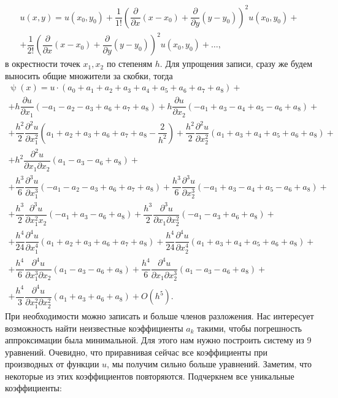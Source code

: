 \documentclass[a4paper, 12pt]{article}
\renewcommand{\psi}{\uppsi}
\renewcommand{\d}{\partial}
\begin{document}
\begin{enumerate}
\begin{multline*}
		u(x,y) = u(x_0, y_0) + \dfrac{1}{1!}\left(\dfrac{\d }{\d x}(x-x_0) +\dfrac{\d }{\d y}(y-y_0)\right)^2u(x_0, y_0) +\\+  \dfrac{1}{2!}\left(\dfrac{\d }{\d x}(x-x_0) +\dfrac{\d }{\d y}(y-y_0)\right)^2u(x_0, y_0) + \ldots,
	\end{multline*} в окрестности точек $x_1, x_2$ по степеням $h$. Для упрощения записи, сразу же будем выносить общие множители за скобки, тогда
	\begin{multline*}
		\psi(x) = u\cdot (a_0 + a_1 + a_2 + a_3 + a_4 + a_5 + a_6 + a_7 + a_8) + \\ + h\dfrac{\d u}{\d x_1} (-a_1 -a_2 -a_3 + a_6 + a_7 + a_8) + h\dfrac{\d u}{\d x_2} (-a_1 +a_3 - a_4 + a_5 - a_6 + a_8) + \\ + \dfrac{h^2}{2}\dfrac{\d^2 u}{\d x_1^2} \left(a_1 + a_2 + a_3 + a_6 + a_7 + a_8 - \dfrac{2}{h^2}\right) + \dfrac{h^2}{2}\dfrac{\d^2 u}{\d x_2^2} \left(a_1 + a_3 + a_4 + a_5 + a_6 + a_8\right) + \\ + h^2\dfrac{\d^2 u}{\d x_1 \d x_2} \left(a_1 - a_3 - a_6 + a_8\right) + \\ + \dfrac{h^3}{6} \dfrac{\d^3 u}{\d x_1^3} ( -a_1 -a_2 - a_3 + a_6 + a_7 + a_8) + \dfrac{h^3}{6} \dfrac{\d^3 u}{\d x_2^3} ( -a_1 + a_3 - a_4 + a_5 - a_6 + a_8) + \\ + \dfrac{h^3}{2} \dfrac{\d^3 u}{\d x_1^2 x_2} ( -a_1 +a_3 - a_6 + a_8) + \dfrac{h^3}{2} \dfrac{\d^3 u}{\d x_1 \d x_2^2} ( -a_1 -a_3 + a_6 + a_8) + \\ + \dfrac{h^4}{24} \dfrac{\d^4 u}{\d x_1^4} ( a_1 + a_2 + a_3 + a_6 + a_7 + a_8) +   \dfrac{h^4}{24} \dfrac{\d^4 u}{\d x_2^4} (a_1 + a_3 + a_4 + a_5 + a_6 + a_8) + \\ + \dfrac{h^4}{6} \dfrac{\d^4 u}{\d x_1^3 \d x_2} (a_1 - a_3 - a_6 + a_8) + \dfrac{h^4}{6} \dfrac{\d^4 u}{\d x_1 \d x_2^3} (a_1 - a_3 - a_6 + a_8) + \\ + \dfrac{h^4}{3} \dfrac{\d^4 u}{\d x_1^2\d x_2^2}(a_1 + a_3 + a_6 + a_8) + O(h^5).  
	\end{multline*}
	При необходимости можно записать и больше членов разложения.
	Нас интересует возможность найти неизвестные коэффициенты $a_k$ такими, чтобы погрешность аппроксимации была минимальной. Для этого нам нужно построить систему из 9 уравнений. Очевидно, что приравнивая сейчас все коэффициенты при производных от функции $u$, мы получим сильно больше уравнений. Заметим, что некоторые из этих коэффициентов повторяются. Подчеркнем все уникальные коэффициенты:
	\begin{multline*}

\end{multline*}
\end{enumerate}
\end{document}
